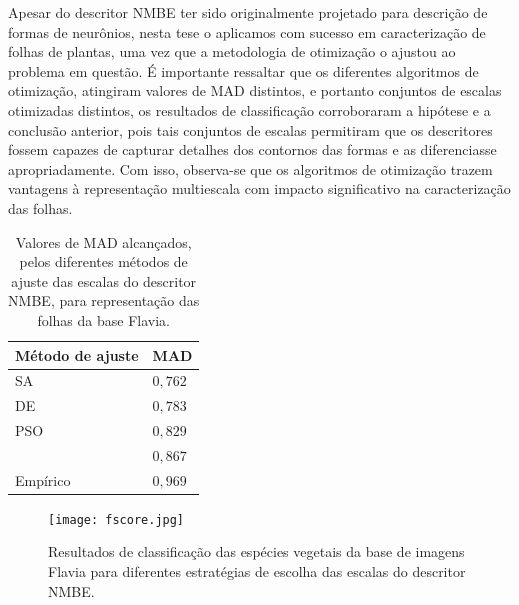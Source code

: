 Apesar do descritor \ac{NMBE} ter sido originalmente projetado para descrição de formas de neurônios, nesta tese o aplicamos com sucesso em caracterização de folhas de plantas, uma vez que a metodologia de otimização o ajustou ao problema em questão.
É importante ressaltar que os diferentes algoritmos de otimização, atingiram valores de \ac{MAD} distintos, e portanto conjuntos de escalas otimizadas distintos, os resultados de classificação corroboraram a hipótese e a conclusão anterior, pois tais conjuntos de escalas  permitiram que os descritores fossem capazes de capturar detalhes dos contornos das formas e as diferenciasse apropriadamente. Com isso, observa-se que os algoritmos de otimização trazem vantagens à representação multiescala com impacto significativo na caracterização das folhas. 

\begin{table}[]
	\centering
	\caption{Valores de \ac{MAD} alcançados, pelos diferentes métodos de ajuste das escalas do descritor \ac{NMBE}, para representação das folhas da base Flavia.}
	\label{tab:leaves_supervised_results}
	\begin{tabular}{ll}
		\toprule[1.5pt]
		Método de ajuste& \ac{MAD}\\
		\midrule
		\ac{SA}  & $0,762$\\
		\ac{DE}  & $0,783$\\
		\ac{PSO}&  $0,829$\\
		\citeonline{Costa:1997}& $0,867$\\
		Empírico& $0,969$\\
		\bottomrule[1.5pt]
	\end{tabular}
\end{table}

\begin{figure}[!htb]
	\caption{\label{fig:leaves_fscore} Resultados de classificação das espécies vegetais da base de imagens Flavia para diferentes estratégias de escolha das escalas do descritor \ac{NMBE}.}
	\centering
	\texttt{[image: fscore.jpg]}
\end{figure}


